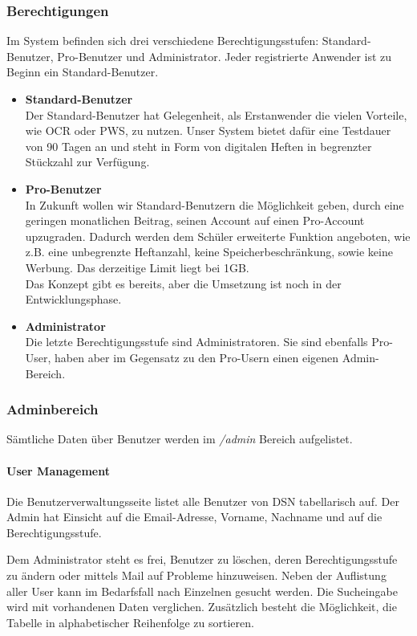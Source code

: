 \subsubsection{Berechtigungen}
Im System befinden sich drei verschiedene Berechtigungsstufen: Standard-Benutzer, Pro-Benutzer und Administrator. Jeder registrierte Anwender ist zu Beginn ein Standard-Benutzer.

\begin{itemize}
\item \textbf{Standard-Benutzer}\\ Der Standard-Benutzer hat Gelegenheit, als Erstanwender die vielen Vorteile, wie OCR oder PWS, zu nutzen. Unser System bietet dafür eine Testdauer von 90 Tagen an und steht in Form von digitalen Heften in begrenzter Stückzahl zur Verfügung.
\item \textbf{Pro-Benutzer}\\ In Zukunft wollen wir Standard-Benutzern die Möglichkeit geben, durch eine geringen monatlichen Beitrag, seinen Account auf einen Pro-Account upzugraden. Dadurch werden dem Schüler erweiterte Funktion angeboten, wie z.B. eine unbegrenzte Heftanzahl, keine Speicherbeschränkung, sowie keine Werbung. Das derzeitige Limit liegt bei 1GB.\\
Das Konzept gibt es bereits, aber die Umsetzung ist noch in der Entwicklungsphase.
\item \textbf{Administrator}\\ Die letzte Berechtigungsstufe sind Administratoren. Sie sind ebenfalls Pro-User, haben aber im Gegensatz zu den Pro-Usern einen eigenen Admin-Bereich.
\end{itemize}

\subsubsection{Adminbereich}
Sämtliche Daten über Benutzer werden im \textit{/admin} Bereich aufgelistet.
\paragraph{User Management}
Die Benutzerverwaltungsseite listet alle Benutzer von DSN tabellarisch auf. Der Admin hat Einsicht auf die Email-Adresse, Vorname, Nachname und auf die Berechtigungsstufe.

Dem Administrator steht es frei, Benutzer zu löschen, deren Berechtigungsstufe zu ändern oder mittels Mail auf Probleme hinzuweisen. Neben der Auflistung aller User kann im Bedarfsfall nach Einzelnen gesucht werden. Die Sucheingabe wird mit vorhandenen Daten verglichen. Zusätzlich besteht die Möglichkeit, die Tabelle in alphabetischer Reihenfolge zu sortieren.

